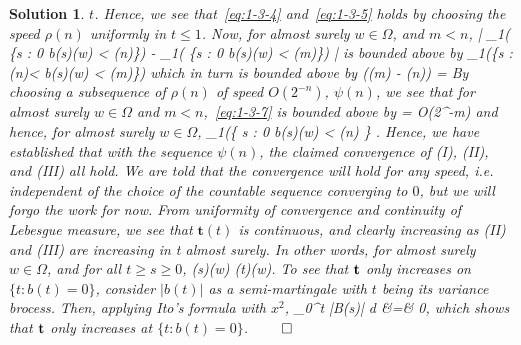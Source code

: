 \documentclass[11pt]{article}
\theoremstyle{plain}
\def\eQb#1\eQe{\begin{eqnarray*}#1\end{eqnarray*}}
\def\eQnb#1\eQne{\begin{eqnarray}#1\end{eqnarray}}
\theoremstyle{quest}
\newtheorem*{solution}{Solution}
\begin{document}
\begin{solution}
$t$. Hence, we see that~\eqref{eq:1-3-4} and~\eqref{eq:1-3-5} holds by choosing
the speed $\rho(n)$ uniformly in $t \leq 1$. Now, for almost surely $w \in \Omega$,
and $m < n$,  
\eQnb
\left|  
\lambda_1( \{s \in [0,t] : 0 \leq b(s)(w) < \rho(n)\}) -
\lambda_1( \{s \in [0,t] : 0 \leq b(s)(w) < \rho(m)\}) \right| \label{eq:1-3-7} 
\eQne 
is bounded above by
\eQb
\dfrac{1}{2\rho{(m)}}  
\lambda_1(\{s \in [0,t] : \rho(n)< b(s)(w) < \rho(m)\})  
\eQe
which in turn is bounded above by
\eQb
\dfrac{1}{2\rho(m)}  (\rho(m) - \rho(n)) = 
\eQe
By choosing a subsequence of $\rho(n)$ of speed $O(2^{-n})$, $\psi(n)$, we see that
for almost surely $w \in \Omega$ and $m < n$,~\eqref{eq:1-3-7} is bounded above by 
\eQb
\dfrac{\psi(m) - \psi(n)}{\pi \psi(m)}  = O(2^{-m})
\eQe
and hence, for almost surely $w \in \Omega$,
\eQb
\dfrac{1}{2\psi(n)}\lambda_1(\{ s \in [0,t] : 0 \leq b(s)(w) < \psi(n) \} \>\>\>
.
\eQe
Hence, we have established that with the sequence $\psi(n)$, the claimed convergence
of (I), (II), and (III) all hold. We are told that the convergence will hold for any 
speed, i.e. independent of the choice of the countable sequence converging to $0$,
but we will forgo the work for now.
From uniformity of convergence and continuity of Lebesgue measure, we see that
$\textbf{t}(t)$ is continuous, and clearly increasing as (II) and (III) are
increasing in t almost surely. In other words, for almost surely $w \in \Omega$, and
for all $t \geq s \geq 0$,
\eQb
\bold{t}(s)(w) \leq {}(t)(w). 
\eQe
To see that $\bold{t}$ only increases on $\{t : b(t) = 0\}$, consider
$|b(t)|$ as a semi-martingale with $t$ being its variance brocess. Then, applying
Ito's formula with $x^2$, 
\eQb
\int_{0}^{t} |B(s)| d &=& 0,
\eQe
which shows that $\bold{t}$ only increases at $\{t : b(t) = 0\}$. \hfill $\qed$

 
\end{solution}

\newpage
\end{document}
